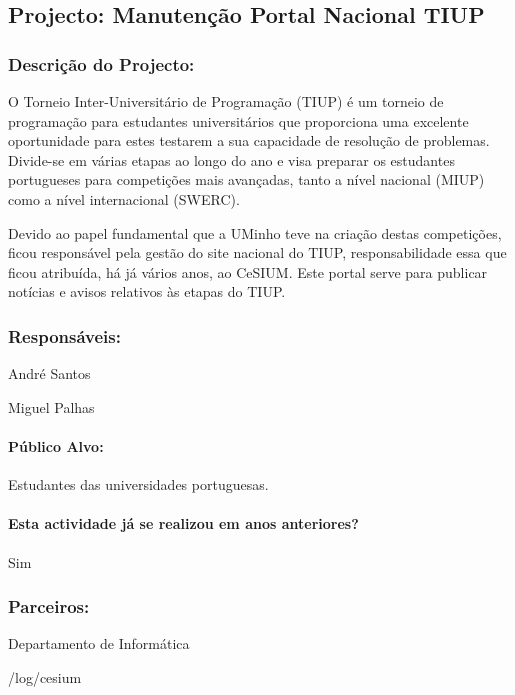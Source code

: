 \subsection{Projecto: Manutenção Portal Nacional TIUP}

\subsubsection*{Descrição do Projecto:}
O Torneio Inter-Universitário de Programação (TIUP) é um torneio de programação para estudantes universitários que proporciona uma excelente oportunidade para estes testarem a sua capacidade de resolução de problemas. Divide-se em várias etapas ao longo do ano e visa preparar os estudantes portugueses para competições mais avançadas, tanto a nível nacional (MIUP) como a nível internacional (SWERC).

Devido ao papel fundamental que a UMinho teve na criação destas competições, ficou responsável pela gestão do site nacional do TIUP, responsabilidade essa que ficou atribuída, há já vários anos, ao CeSIUM. Este portal serve para publicar notícias e avisos relativos às etapas do TIUP.

\subsubsection*{Responsáveis:}
\begin{itemizedash}
	\item{André Santos}
	\item{Miguel Palhas}
\end{itemizedash}

\paragraph{Público Alvo:}
Estudantes das universidades portuguesas.

\paragraph{Esta actividade já se realizou em anos anteriores?}
Sim

\subsubsection*{Parceiros:}
\begin{itemizedash}
    \item{Departamento de Informática}
	\item{/log/cesium}
\end{itemizedash}

\vspace{20pt}
